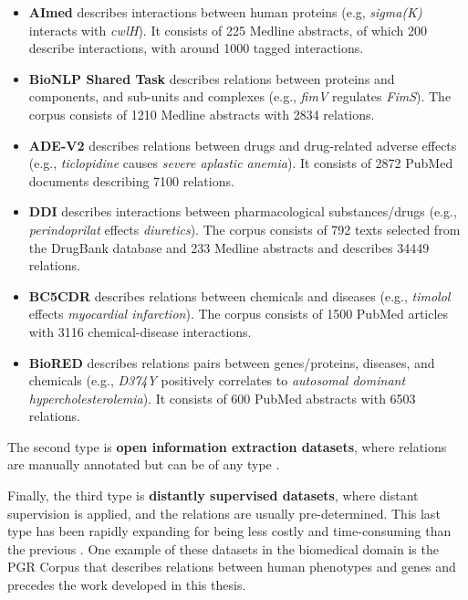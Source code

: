 \begin{itemize}
    \item \textbf{AImed} \citep{mooney2006subsequence} describes interactions between human proteins (e.g, \textit{sigma(K)} interacts with \textit{cwlH}). It consists of 225 Medline abstracts, of which 200 describe interactions, with around 1000 tagged interactions.
    \item \textbf{BioNLP Shared Task} \citep{kim2011overview} describes relations between proteins and components, and sub-units and complexes (e.g., \textit{fimV} regulates \textit{FimS}). The corpus consists of 1210 Medline abstracts with 2834 relations. 
    \item \textbf{ADE-V2} \citep{gurulingappa2012development} describes relations between drugs and drug-related adverse effects (e.g., \textit{ticlopidine} causes \textit{severe aplastic anemia}). It consists of 2872 PubMed documents describing 7100 relations. 
    \item \textbf{DDI} \citep{herrero2013ddi} describes interactions between pharmacological substances/drugs (e.g., \textit{perindoprilat} effects \textit{diuretics}). The corpus consists of 792 texts selected from the DrugBank database and 233 Medline abstracts and describes 34449 relations. 
    \item \textbf{BC5CDR} \citep{li2016biocreative} describes relations between chemicals and diseases (e.g., \textit{timolol} effects \textit{myocardial infarction}). The corpus consists of 1500 PubMed articles with 3116 chemical-disease interactions.
    \item \textbf{BioRED} \citep{luo2022biored} describes relations pairs between genes/proteins, diseases, and chemicals (e.g., \textit{D374Y} positively correlates to \textit{autosomal dominant hypercholesterolemia}). It consists of 600 PubMed abstracts with 6503 relations. 
\end{itemize}

The second type is \textbf{open information extraction datasets}, where relations are manually annotated but can be of any type \citep{fader2011identifying,del2013clausie,mesquita2013effectiveness}. 

Finally, the third type is \textbf{distantly supervised datasets}, where distant supervision is applied, and the relations are usually pre-determined. This last type has been rapidly expanding for being less costly and time-consuming than the previous \citep{riedel2010modeling}. One example of these datasets in the biomedical domain is the PGR Corpus \citep{sousa2019silver} that describes relations between human phenotypes and genes and precedes the work developed in this thesis.

